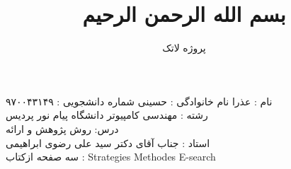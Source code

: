 \documentclass[a4 paper,12pt]{article}\usepackage{xepersian}
\title{بسم الله الرحمن الرحیم}
\author{پروژه لاتک}
\begin{document}
\maketitle



\noindent
نام   : عذرا نام خانوادگی : حسینی          شماره دانشجویی : ۹۷۰۰۴۳۱۴۹\\  رشته : مهندسی کامپیوتر دانشگاه پیام نور پردیس  \\ درس:  روش پژوهش و ارائه  \\ استاد : جناب آقای دکتر سید علی رضوی ابراهیمی\\

\noindent
                                                                                                                                                                                                                                                                                                                                                                                                          سه صفحه ازکتاب : Strategies Methodes E-search
\vspace{0.1cm}
\vspace{0.1cm}
\end{document}
